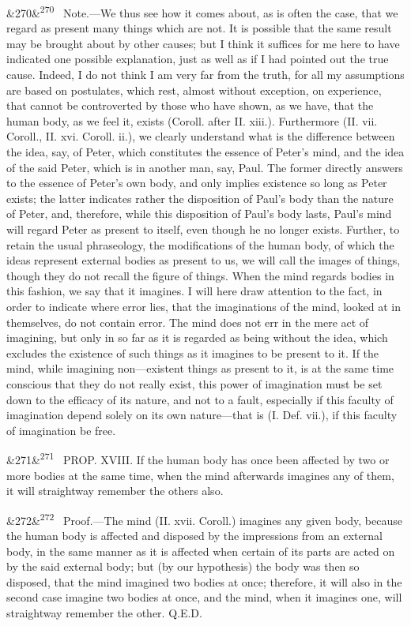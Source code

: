 \documentclass[12pt]{article}
\newcommand{\para}[1][]{\par\noindent\ifx&#1&\else\textsuperscript{\footnotesize #1}~\fi}
\begin{document}
\para[270] Note.---We thus see how it comes about, as is often the case, that we regard as present many things which are not. It is possible that the same result may be brought about by other causes; but I think it suffices for me here to have indicated one possible explanation, just as well as if I had pointed out the true cause. Indeed, I do not think I am very far from the truth, for all my assumptions are based on postulates, which rest, almost without exception, on experience, that cannot be controverted by those who have shown, as we have, that the human body, as we feel it, exists (Coroll. after II. xiii.). Furthermore (II. vii. Coroll., II. xvi. Coroll. ii.), we clearly understand what is the difference between the idea, say, of Peter, which constitutes the essence of Peter's mind, and the idea of the said Peter, which is in another man, say, Paul. The former directly answers to the essence of Peter's own body, and only implies existence so long as Peter exists; the latter indicates rather the disposition of Paul's body than the nature of Peter, and, therefore, while this disposition of Paul's body lasts, Paul's mind will regard Peter as present to itself, even though he no longer exists. Further, to retain the usual phraseology, the modifications of the human body, of which the ideas represent external bodies as present to us, we will call the images of things, though they do not recall the figure of things. When the mind regards bodies in this fashion, we say that it imagines. I will here draw attention to the fact, in order to indicate where error lies, that the imaginations of the mind, looked at in themselves, do not contain error. The mind does not err in the mere act of imagining, but only in so far as it is regarded as being without the idea, which excludes the existence of such things as it imagines to be present to it. If the mind, while imagining non---existent things as present to it, is at the same time conscious that they do not really exist, this power of imagination must be set down to the efficacy of its nature, and not to a fault, especially if this faculty of imagination depend solely on its own nature---that is (I. Def. vii.), if this faculty of imagination be free.

\para[271] PROP. XVIII. If the human body has once been affected by two or more bodies at the same time, when the mind afterwards imagines any of them, it will straightway remember the others also.

\para[272] Proof.---The mind (II. xvii. Coroll.) imagines any given body, because the human body is affected and disposed by the impressions from an external body, in the same manner as it is affected when certain of its parts are acted on by the said external body; but (by our hypothesis) the body was then so disposed, that the mind imagined two bodies at once; therefore, it will also in the second case imagine two bodies at once, and the mind, when it imagines one, will straightway remember the other. Q.E.D.
\end{document}
